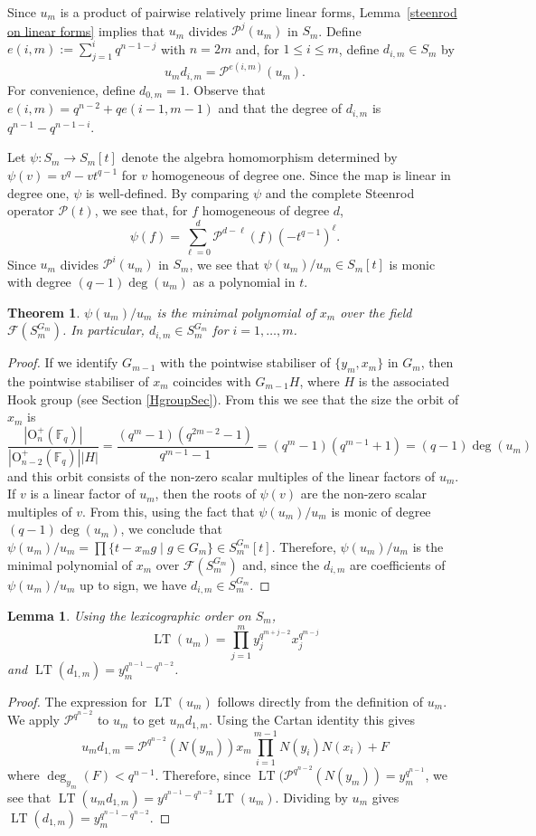 \documentclass{amsart}
\newcommand{\field}{\mathbb{F}}
\newcommand{\orthp}[2]{{{\text{O}^{+}_{{#1}}(\field_{#2})}}}
\newcommand{\invring}{S_m^{G_m}}
\newcommand{\PP}{\mathcal{P}}
\newcommand{\F}{\mathcal{F}}
\newtheorem{thm}[subsection]{Theorem}
\newtheorem{lem}[subsection]{Lemma}
\DeclareMathOperator{\lt}{LT}
\begin{document}
Since $u_m$ is a product of pairwise relatively  prime linear forms, Lemma~\ref{steenrod on linear forms}
implies that $u_m$ divides $\PP^j(u_m)$ in $S_m$.
Define $e(i,m):=\sum_{j=1}^i q^{n-1-j}$ with $n=2m$  and, for $1\leq i \leq m$, define $d_{i,m}\in S_m$ by 
$$u_m d_{i,m}=\PP^{e(i,m)}(u_m ).$$
For convenience, define $d_{0,m}=1$. Observe that $e(i,m)=q^{n-2}+q e(i-1,m-1)$ and that the degree of $d_{i,m}$ is $q^{n-1}-q^{n-1-i}$.

Let $\psi:S_m\to S_m[t]$ denote the algebra homomorphism determined by $\psi(v)=v^q-vt^{q-1}$ for $v$ homogeneous of degree one.
Since the map is linear in degree one, $\psi$ is well-defined.
By comparing $\psi$ and the complete Steenrod operator $\PP(t)$, we see that, for $f$ homogeneous of degree $d$,
$$\psi(f)=\sum_{\ell=0}^d\PP^{d-\ell}(f)(-t^{q-1})^{\ell}.$$
Since $u_m$ divides $\PP^i(u_m)$ in $S_m$, we see that $\psi(u_m)/u_m\in S_m[t]$ is monic with degree $(q-1)\deg(u_m)$ as a polynomial in $t$.

\begin{thm} \label{min_poly_thm} $\psi(u_m)/u_m$ is the minimal polynomial of $x_m$ over the field $\F(S_m^{G_m})$.
In particular, $d_{i,m}\in S_m^{G_m}$ for $i=1,\ldots,m$.
\end{thm}
\begin{proof} If we identify $G_{m-1}$ with the pointwise stabiliser of $\{y_m,x_m\}$ in $G_m$, then the pointwise stabiliser of $x_m$ coincides
with $G_{m-1}H$, where $H$ is the associated Hook group (see Section \ref{HgroupSec}). From this we see that the size the orbit of $x_m$ is
$$\frac{|\orthp{n}{q}|}{|\orthp{n-2}{q}| |H|}=\frac{(q^m-1)(q^{2m-2}-1)}{q^{m-1}-1}=(q^m-1)(q^{m-1}+1)=(q-1)\deg(u_m)$$
and this orbit consists of the non-zero scalar multiples of the linear factors of $u_m$. If $v$ is a linear factor of $u_m$, then the roots of $\psi(v)$ are the non-zero scalar multiples of $v$. From this, using the fact that $\psi(u_m)/u_m$ is monic of degree $(q-1)\deg(u_m)$,
 we conclude that 
$\psi(u_m)/u_m=\prod\{t-x_m g\mid g\in G_m\}\in S_m^{G_m}[t]$. Therefore, $\psi(u_m)/u_m$ is the minimal polynomial of $x_m$ over $\F(\invring)$ and, since the $d_{i,m}$
are coefficients of $\psi(u_m)/u_m$ up to sign, we have $d_{i,m}\in S_m^{G_m}$.
\end{proof}

\begin{lem}\label{lex_lt_lem} Using the lexicographic order on $S_m$, 
$$\lt(u_m)=\prod_{j=1}^m y_j^{q^{m+j-2}}x_j^{q^{m-j}}$$ 
and $\lt(d_{1,m})=y_m^{q^{n-1}-q^{n-2}}$.
\end{lem}
\begin{proof} The expression for $\lt(u_m)$ follows directly from the definition of $u_m$.
We apply $\PP^{q^{n-2}}$ to $u_m$ to get $u_m d_{1,m}$. Using the Cartan identity this gives
$$u_m d_{1,m}=\PP^{q^{n-2}}\left(N(y_m)\right)x_m\prod_{i=1}^{m-1} N(y_i)N(x_i)+F$$
where $\deg_{y_m}(F)<q^{n-1}$. Therefore, since $\lt(\PP^{q^{n-2}}(N(y_m))=y_m^{q^{n-1}}$,
we see that $\lt(u_md_{1,m})=y^{q^{n-1}-q^{n-2}}\lt(u_m)$.
Dividing by $u_m$ gives $\lt(d_{1,m})=y_m^{q^{n-1}-q^{n-2}}$.
\end{proof}
\end{document}
